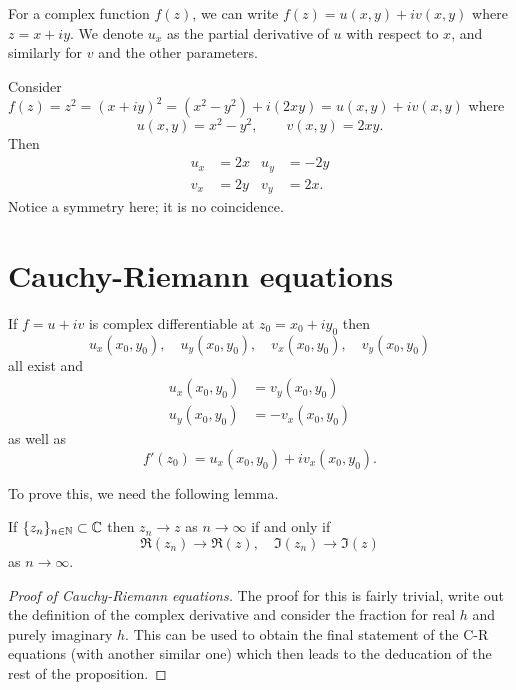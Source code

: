 For a complex function $f(z)$, we can write $f(z) = u(x, y) + iv(x, y)$ where $z = x + iy$. We denote $u_x$ as the partial derivative of $u$ with respect to $x$, and similarly for $v$ and the other parameters. 

\begin{example}
    Consider $f(z) = z^2 = (x + iy)^2 = (x^2 - y^2) + i(2xy) = u(x, y) + iv(x, y)$ where
    \[ u(x, y) = x^2 - y^2,\qquad v(x, y) = 2xy. \]
    Then
    \begin{align*}
        u_x &= 2x & u_y &= -2y \\
        v_x &= 2y & v_y &= 2x.
    \end{align*}
    Notice a symmetry here; it is no coincidence.
\end{example}

\section{Cauchy-Riemann equations}

\begin{proposition}
    If $f = u + iv$ is complex differentiable at $z_0 = x_0 + iy_0$ then
    \[ u_x(x_0, y_0), \quad u_y(x_0, y_0), \quad v_x(x_0, y_0), \quad v_y(x_0, y_0) \]
    all exist and
    \begin{align*}
        u_x(x_0, y_0) &= v_y(x_0, y_0) \\
        u_y(x_0, y_0) &= -v_x(x_0, y_0)
    \end{align*}
    as well as 
    \[ f'(z_0) = u_x(x_0, y_0) + iv_x(x_0, y_0). \]
\end{proposition}

To prove this, we need the following lemma.

\begin{lemma}
    If $\{ z_n \}_{n \in \mathbb{N}} \subset \mathbb{C}$ then $z_n \to z$ as $n \to \infty$ if and only if 
    \[ \Re{(z_n)} \to \Re{(z)}, \quad \Im{(z_n)} \to \Im{(z)} \]
    as $n \to \infty$.
\end{lemma}

\begin{proof}[Proof of Cauchy-Riemann equations]
    The proof for this is fairly trivial, write out the definition of the complex derivative and consider the fraction for real $h$ and purely imaginary $h$. This can be used to obtain the final statement of the C-R equations (with another similar one) which then leads to the deducation of the rest of the proposition.
\end{proof}
